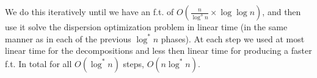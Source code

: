 \documentclass[11pt,a4paper]{article}
\theoremstyle{definition}
\theoremstyle{remark}
\begin{document}
We do this iteratively until we have an f.t. of $O(\frac{n}{\log ^3n} \times \log \log n)$, and then use it solve the dispersion optimization problem in linear time (in the same manner as in each of the previous $\log ^*n$ phases).
At each step we used at most linear time for the decompositions and less then linear time for producing a faster f.t. In total for all $O(\log ^*n)$ steps, $O(n \log ^*n)$. 



\end{document}
